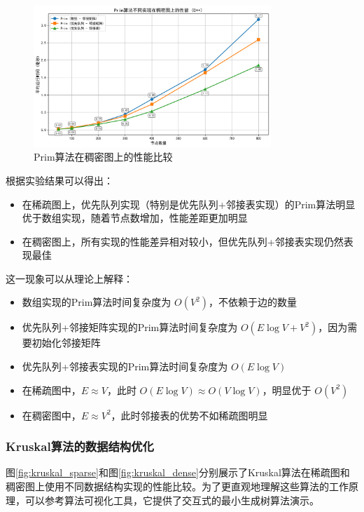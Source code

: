 \documentclass[a4paper,12pt]{ctexart}
\begin{document}
\begin{figure}[htbp]
    \centering
    \includegraphics[width=0.8\textwidth]{img/img_cpp2/prim_dense_comparison_cpp.png}
    \caption{Prim算法在稠密图上的性能比较}
    \label{fig:prim_dense}
\end{figure}

根据实验结果可以得出：
\begin{itemize}
    \item 在稀疏图上，优先队列实现（特别是优先队列+邻接表实现）的Prim算法明显优于数组实现，随着节点数增加，性能差距更加明显
    \item 在稠密图上，所有实现的性能差异相对较小，但优先队列+邻接表实现仍然表现最佳    
\end{itemize}

这一现象可以从理论上解释：
\begin{itemize}
    \item 数组实现的Prim算法时间复杂度为 $O(V^2)$，不依赖于边的数量
    \item 优先队列+邻接矩阵实现的Prim算法时间复杂度为 $O(E \log V + V^2)$，因为需要初始化邻接矩阵
    \item 优先队列+邻接表实现的Prim算法时间复杂度为 $O(E \log V)$
    \item 在稀疏图中，$E \approx V$，此时 $O(E \log V) \approx O(V \log V)$，明显优于 $O(V^2)$
    \item 在稠密图中，$E \approx V^2$，此时邻接表的优势不如稀疏图明显
\end{itemize}

\subsubsection{Kruskal算法的数据结构优化}
图\ref{fig:kruskal_sparse}和图\ref{fig:kruskal_dense}分别展示了Kruskal算法在稀疏图和稠密图上使用不同数据结构实现的性能比较。为了更直观地理解这些算法的工作原理，可以参考算法可视化工具\cite{prim_visual}，它提供了交互式的最小生成树算法演示。
\end{document}

